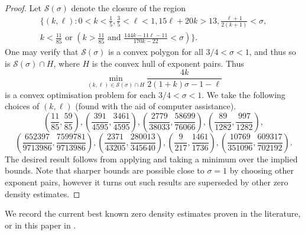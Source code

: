 \documentclass[a4paper, 10pt]{amsart}
\begin{document}
\begin{proof}
Let $\mathcal{S}(\sigma)$ denote the closure of the region
    \begin{align*}
    \Bigg\{(k, \ell) : 0 < k < \frac{1}{5}, \frac{3}{5} < \ell < 1, 15\ell + 20k > 13, \frac{\ell + 1}{2(k + 1)} < \sigma, \\
    k < \frac{11}{85} \text{ or } \left(k > \frac{11}{85} \text{ and } \frac{144k - 11\ell - 11}{170k - 22} < \sigma\right)\Bigg\}.
    \end{align*}
    One may verify that $\mathcal{S}(\sigma)$ is a convex polygon for all $3/4 < \sigma < 1$, and thus so is $\mathcal{S}(\sigma) \cap H$, where $H$ is the convex hull of exponent pairs. Thus
    \[
    \min_{(k, \ell) \in \mathcal{S}(\sigma) \cap H}\frac{4k}{2(1 + k)\sigma - 1 - \ell}
    \]
    is a convex optimisation problem for each $3/4 < \sigma < 1$.
    We take the following choices of $(k, \ell)$ (found with the aid of computer assistance).
    \[
    \left(\frac{11}{85}, \frac{59}{85}\right),
    \left(\frac{391}{4595}, \frac{3461}{4595}\right),
    \left(\frac{2779}{38033}, \frac{58699}{76066}\right),
    \left(\frac{89}{1282}, \frac{997}{1282}\right),
    \]
    \[
    \left(\frac{652397}{9713986}, \frac{7599781}{9713986}\right),
    \left(\frac{2371}{43205}, \frac{280013}{345640}\right),
    \left(\frac{9}{217}, \frac{1461}{1736}\right),
    \left(\frac{10769}{351096}, \frac{609317}{702192}\right).
    \]
    The desired result follows from applying  and taking a minimum over the implied bounds. Note that sharper bounds are possible close to $\sigma = 1$ by choosing other exponent pairs, however it turns out such results are superseded by other zero density estimates. 
\end{proof}

We record the current best known zero density estimates proven in the literature, or in this paper in .
\end{document}
